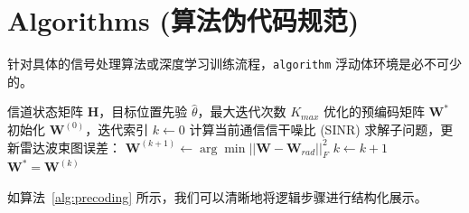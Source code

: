 \section{Algorithms (算法伪代码规范)}

针对具体的信号处理算法或深度学习训练流程，\texttt{algorithm} 浮动体环境是必不可少的。

\begin{algorithm}[htbp]
\caption{联合感知与通信预编码算法}
\label{alg:precoding}
\begin{algorithmic}[1] %
    \Require 信道状态矩阵 $\mathbf{H}$，目标位置先验 $\hat{\theta}$，最大迭代次数 $K_{max}$
    \Ensure 优化的预编码矩阵 $\mathbf{W}^*$
    \State 初始化 $\mathbf{W}^{(0)}$，迭代索引 $k \gets 0$
        \State 计算当前通信信干噪比 (SINR)
        \State 求解子问题，更新雷达波束图误差：
        \State $\mathbf{W}^{(k+1)} \gets \arg\min ||\mathbf{W} - \mathbf{W}_{rad}||_F^2$
        \State $k \gets k + 1$
    \EndWhile
    \State \Return $\mathbf{W}^* = \mathbf{W}^{(k)}$
\end{algorithmic}
\end{algorithm}

如算法~\ref{alg:precoding} 所示，我们可以清晰地将逻辑步骤进行结构化展示。


